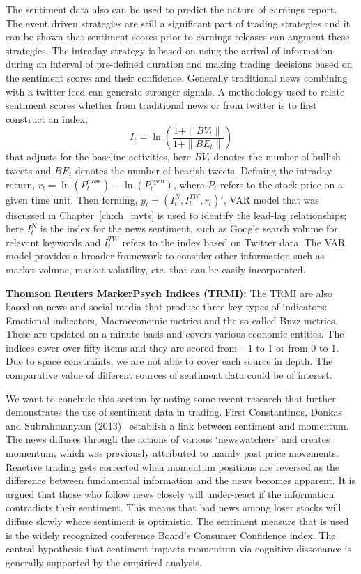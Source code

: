 The sentiment data also can be used to predict the nature of earnings report. The event driven strategies are still a significant part of trading strategies and it can be shown that sentiment scores prior to earnings releases can augment these strategies. The intraday strategy is based on using the arrival of information during an interval of pre-defined duration and making trading decisions based on the sentiment scores and their confidence. Generally traditional news combining with a twitter feed can generate stronger signals. A methodology used to relate sentiment scores whether from traditional news or from twitter is to first construct an index, 
	\begin{equation}\label{eqn:itwithln}
	I_t= \ln\left( \dfrac{1+\| BV_t \|}{1+\| BE_t \|}\right)
	\end{equation}  
that adjusts for the baseline activities, here $BV_t$ denotes the number of bullish tweets and $BE_t$ denotes the number of bearish tweets. Defining the intraday return, $r_t= \ln(P_t^{\text{close}}) - \ln(P_t^{\text{open}})$, where $P_t$ refers to the stock price on a given time unit. Then forming, $y_t=(I_t^N,I_t^{TW},r_t)'$, VAR model that was discussed in Chapter~\ref{ch:ch_mvts} is used to identify the lead-lag relationships; here $I_t^N$ is the index for the news sentiment, such as Google search volume for relevant keywords and $I_t^{TW}$ refers to the index based on Twitter data. The VAR model provides a broader framework to consider other information such as market volume, market volatility, etc. that can be easily incorporated. \twomedskip


\noindent\textbf{Thomson Reuters MarkerPsych Indices (TRMI):} The TRMI are also based on news and social media that produce three key types of indicators: Emotional indicators, Macroeconomic metrics and the so-called Buzz metrics. These are updated on a minute basis and covers various economic entities. The indices cover over fifty items and they are scored from $-1$ to 1 or from 0 to 1. Due to space constraints, we are not able to cover each source in depth. The comparative value of different sources of sentiment data could be of interest.


We want to conclude this section by noting some recent research that further demonstrates the use of sentiment data in trading. First Constantinos, Donkas and Subrahmanyam (2013)~\cite{contdonksub13} establish a link between sentiment and momentum. The news diffuses through the actions of various `newswatchers' and creates momentum, which was previously attributed to mainly past price movements. Reactive trading gets corrected when momentum positions are reversed as the difference between fundamental information and the news becomes apparent. It is argued that those who follow news closely will under-react if the information contradicts their sentiment. This means that bad news among loser stocks will diffuse slowly where sentiment is optimistic. The sentiment measure that is used is the widely recognized conference Board's Consumer Confidence index. The central hypothesis that sentiment impacts momentum via cognitive dissonance is generally supported by the empirical analysis.


